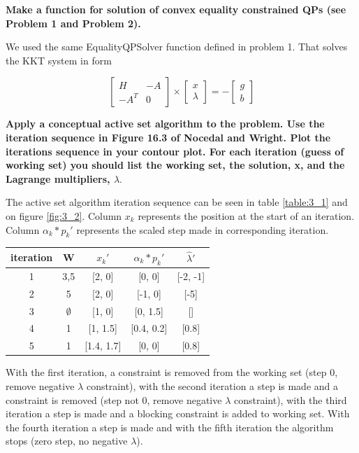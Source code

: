 \textbf{Make a function for solution of convex equality constrained QPs (see Problem 1 and Problem 2).}

We used the same EqualityQPSolver function defined in problem 1. That solves the KKT system in form 

\[\begin{bmatrix}
	    H & -A \\
	    -A^T & 0
    \end{bmatrix} \times
	\begin{bmatrix}
		x\\
		\lambda
	\end{bmatrix}=
	- \begin{bmatrix}
		g\\
		b
	\end{bmatrix}
\]



\textbf{Apply a conceptual active set algorithm to the problem. Use the iteration sequence in Figure 16.3 of Nocedal and Wright. Plot the iterations sequence in your contour plot. For each iteration (guess of working set) you should list the working set, the solution, x, and the Lagrange multipliers, $\lambda$}.


The active set algorithm iteration sequence can be seen in table \ref{table:3_1} and on figure \ref{fig:3_2}. Column $x_k$ represents the position at the start of an iteration. Column $\alpha_k * p_k'$ represents the scaled step made in corresponding iteration.

\begin{center}
     \label{table:3_1} 
    \begin{tabular}{c c c c c  } 
    iteration & W & $x_{k}'$ & $\alpha_k * p_k'$ & $\hat{\lambda}'$ \\ 
    \hline
    1 & 3,5 & [2, 0] & [0, 0] & [-2, -1] \\ 
    2 & 5 & [2, 0] & [-1, 0] & [-5] \\ 
    3 & $\emptyset$ & [1, 0] & [0, 1.5] & [] \\
    4 & 1 & [1, 1.5] & [0.4, 0.2] & [0.8] \\
    5 & 1 & [1.4, 1.7] & [0, 0] & [0.8] \\
    \end{tabular}
\end{center}



With the first iteration, a constraint is removed from the working set (step 0, remove negative $\lambda$ constraint), with the second iteration a step is made and a constraint is removed (step not 0, remove negative $\lambda$ constraint), with the third iteration a step is made and a blocking constraint is added to working set. With the fourth iteration a step is made and with the fifth iteration the algorithm stops (zero step, no negative $\lambda$).


